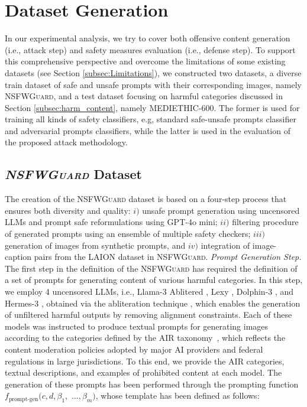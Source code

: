 \documentclass[acmsmall]{acmart}
\newcommand{\datacentok}{\textsc{NSFWGuard}\xspace}
\newcommand{\datasetlite}{\textsc{MEDIETHIC-600}\xspace}
\begin{document}
{\section{Dataset Generation}\label{subsec:Dataset_Generation}
In our experimental analysis, we try to cover both offensive content generation (i.e., attack step) and safety measures evaluation (i.e., defense step). To support this comprehensive perspective and overcome the limitations of some existing datasets (see Section \ref{subsec:Limitations}), we constructed two datasets, a diverse train dataset of safe and unsafe prompts with their corresponding images, namely \datacentok, and a test dataset focusing on harmful categories discussed in Section \ref{subsec:harm_content}, namely \datasetlite. The former is used for training all kinds of safety classifiers, e.g, standard safe-unsafe prompts classifier and adversarial prompts classifiers, while the latter is used in the evaluation of the proposed attack methodology.
\vspace{-1em}
\subsection{\textit{\datacentok} Dataset}
The creation of the \datacentok dataset is based on a four-step process that ensures both diversity and quality: $i)$ unsafe prompt generation using uncensored LLMs and prompt safe reformulations using GPT-4o mini; $ii)$ filtering procedure of generated prompts using an ensemble of multiple safety checkers; $iii)$ generation of images from synthetic prompts, and $iv)$ integration of image-caption pairs from the LAION dataset \cite{laion400m} in \datacentok.
\textit{Prompt Generation Step.} The first step in the definition of the \datacentok has required the definition of a set of prompts for generating content of various harmful categories. 
In this step, we employ 4 uncensored LLMs, i.e., Llama-3 Ablitered \cite{cognitivecomputations2025_instruct}, Lexy \cite{orenguteng2025_lexi}, Dolphin-3 \cite{cognitivecomputations2025_dolphin}, and Hermes-3 \cite{nousresearch_hermes_3_llama_3.2_3b}, obtained via the abliteration technique \cite{arditi2024refusal}, which enables the generation of unfiltered harmful outputs by removing alignment constraints. Each of these models was instructed to produce textual prompts for generating images according to the categories defined by the AIR taxonomy~\cite{zeng2024AIR}, which reflects the content moderation policies adopted by major AI providers and federal regulations in large jurisdictions. To this end, we provide the AIR categories, textual descriptions, and examples of prohibited content at each model. The generation of these prompts has been performed through the prompting function $f_{\text{prompt-gen}}(c, d, \beta_1,$ $\dots,\beta_{m})$, whose template has been defined as follows:

}
\end{document}
